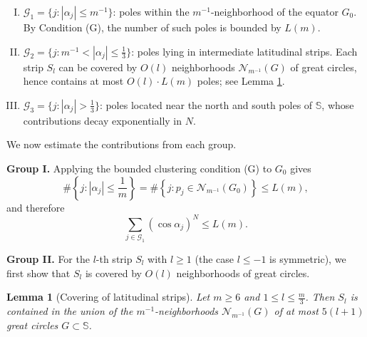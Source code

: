 \documentclass[12pt,reqno]{amsart}
\newcommand{\Gc}{\mathcal{G}}
\newcommand{\Nc}{\mathcal{N}}
\newcommand{\Sb}{\mathbb{S}}
\theoremstyle{plain}
\newtheorem{lemma}[thm]{Lemma}
\theoremstyle{definition}
\theoremstyle{remark}
\numberwithin{equation}{section}
\begin{document}
\begin{enumerate}[(I).]
\item $\Gc_1=\{j:|\alpha_j|\le m^{-1}\}$: poles within the $m^{-1}$-neighborhood of the equator $G_0$.  
By Condition (G), the number of such poles is bounded by $L(m)$.  

\item $\Gc_2=\{j:m^{-1}<|\alpha_j|\le\frac13\}$: poles lying in intermediate latitudinal strips.  
Each strip $S_l$ can be covered by $O(l)$ neighborhoods $\Nc_{m^{-1}}(G)$ of great circles, hence contains at most $O(l)\cdot L(m)$ poles; see Lemma \ref{lemma:cover}.  

\item $\Gc_3=\{j:|\alpha_j|>\frac13\}$: poles located near the north and south poles of $\Sb$, whose contributions decay exponentially in $N$.  
\end{enumerate}

We now estimate the contributions from each group.

\textbf{Group I.} Applying the bounded clustering condition (G) to $G_0$ gives
$$\#\left\{j:\left|\alpha_j\right|\le\frac1m\right\}=\#\left\{j:p_j\in\Nc_{m^{-1}}\left(G_0\right)\right\}\le L(m),$$
and therefore
$$\sum_{j\in\Gc_1}\left(\cos\alpha_j\right)^N\le L(m).$$

\textbf{Group II.} For the $l$-th strip $S_l$ with $l\ge1$ (the case $l\le-1$ is symmetric), we first show that $S_l$ is covered by $O(l)$ neighborhoods of great circles.

\begin{lemma}[Covering of latitudinal strips]\label{lemma:cover}
Let $m\ge6$ and $1\le l\le\frac m3$. Then $S_l$ is contained in the union of the $m^{-1}$-neighborhoods $\Nc_{m^{-1}}(G)$ of at most $5(l+1)$ great circles $G\subset\Sb$.
\end{lemma}
\end{document}
